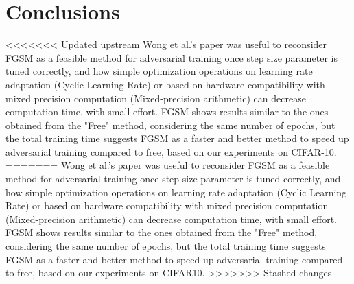 \documentclass{article}
\begin{document}
\newpage
\section{Conclusions}
<<<<<<< Updated upstream
Wong et al.'s paper \cite{WongEtAl2020} was useful to reconsider FGSM as a feasible method for adversarial training once step size parameter is tuned correctly, and how simple optimization operations on learning rate adaptation (Cyclic Learning Rate) or based on hardware compatibility with mixed precision computation (Mixed-precision arithmetic) can decrease computation time, with small effort.
FGSM shows results similar to the ones obtained from the "Free" method, considering the same number of epochs, but the total training time suggests FGSM as a faster and better method to speed up adversarial training compared to free, based on our experiments on CIFAR-10.   
=======
Wong et al.'s paper was useful to reconsider FGSM as a feasible method for adversarial training once step size parameter is tuned correctly, and how simple optimization operations on learning rate adaptation (Cyclic Learning Rate) or based on hardware compatibility with mixed precision computation (Mixed-precision arithmetic) can decrease computation time, with small effort.
FGSM shows results similar to the ones obtained from the "Free" method, considering the same number of epochs, but the total training time suggests FGSM as a faster and better method to speed up adversarial training compared to free, based on our experiments on CIFAR10.   
>>>>>>> Stashed changes
\end{document}
